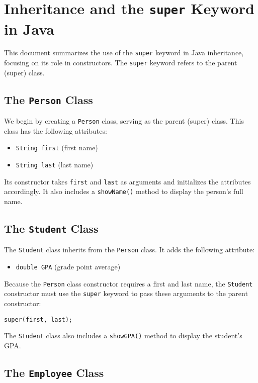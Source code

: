 \documentclass{article}
\begin{document}
\section{Inheritance and the \texttt{super} Keyword in Java}

This document summarizes the use of the \texttt{super} keyword in Java inheritance, focusing on its role in constructors.  The \texttt{super} keyword refers to the parent (super) class.

\subsection{The \texttt{Person} Class}

We begin by creating a \texttt{Person} class, serving as the parent (super) class.  This class has the following attributes:

\begin{itemize}
    \item \texttt{String first} (first name)
    \item \texttt{String last} (last name)
\end{itemize}

Its constructor takes \texttt{first} and \texttt{last} as arguments and initializes the attributes accordingly. It also includes a \texttt{showName()} method to display the person's full name.


\subsection{The \texttt{Student} Class}

The \texttt{Student} class inherits from the \texttt{Person} class.  It adds the following attribute:

\begin{itemize}
    \item \texttt{double GPA} (grade point average)
\end{itemize}

Because the \texttt{Person} class constructor requires a first and last name, the \texttt{Student} constructor must use the \texttt{super} keyword to pass these arguments to the parent constructor:

\texttt{super(first, last);}

The \texttt{Student} class also includes a \texttt{showGPA()} method to display the student's GPA.


\subsection{The \texttt{Employee} Class}
\end{document}
